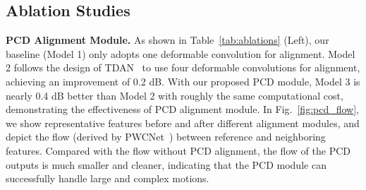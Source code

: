 \documentclass[10pt,twocolumn,letterpaper]{article}
\begin{document}
\subsection{Ablation Studies}
\label{subsec:ablation_study}
\vspace{-0.3cm}
\noindent \textbf{PCD Alignment Module.}
As shown in Table~\ref{tab:ablations} (Left), our baseline (Model 1) only adopts one deformable convolution for alignment. Model 2 follows the design of TDAN~\cite{tian2018tdan} to use four deformable convolutions for alignment, achieving an improvement of 0.2 dB. With our proposed PCD module, Model 3 is nearly 0.4 dB better than Model 2 with roughly the same computational cost, demonstrating the effectiveness of PCD alignment module. 
In Fig.~\ref{fig:pcd_flow}, we show representative features before and after different alignment modules, and depict the flow (derived by PWCNet~\cite{sun2018pwc}) between reference and neighboring features. Compared with the flow without PCD alignment, the flow of the PCD outputs is much smaller and cleaner, indicating that the PCD module can successfully handle large and complex motions.
\end{document}
